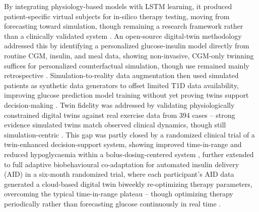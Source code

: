 \documentclass[journal]{IEEEtran}
\begin{document}
By integrating physiology-based models with LSTM learning, it produced patient-specific virtual subjects for in-silico therapy testing, moving from forecasting toward simulation, though remaining a research framework rather than a clinically validated system \cite{ref13}. An open-source digital-twin methodology addressed this by identifying a personalized glucose-insulin model directly from routine CGM, insulin, and meal data, showing non-invasive, CGM-only twinning suffices for personalized counterfactual simulation, though use remained mainly retrospective \cite{ref14}. Simulation-to-reality data augmentation then used simulated patients as synthetic data generators to offset limited T1D data availability, improving glucose prediction model training without yet proving twins support decision-making \cite{ref15}. Twin fidelity was addressed by validating physiologically constrained digital twins against real exercise data from 394 cases -- strong evidence simulated twins match observed clinical dynamics, though still simulation-centric \cite{ref16}. This gap was partly closed by a randomized clinical trial of a twin-enhanced decision-support system, showing improved time-in-range and reduced hypoglycaemia within a bolus-dosing-centered system \cite{ref17}, further extended to full adaptive biobehavioural co-adaptation for automated insulin delivery (AID) in a six-month randomized trial, where each participant's AID data generated a cloud-based digital twin biweekly re-optimizing therapy parameters, overcoming the typical time-in-range plateau -- though optimizing therapy periodically rather than forecasting glucose continuously in real time \cite{ref18}.
\end{document}
